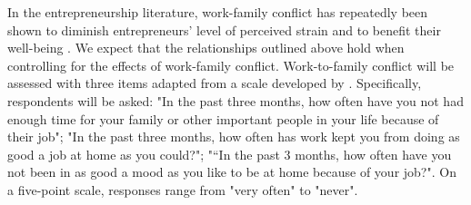 \documentclass[man, 12pt, a4paper, noextraspace]{apa6}
\begin{document}
In the entrepreneurship literature, work-family conflict has repeatedly been shown to diminish entrepreneurs' level of perceived strain and to benefit their well-being \parencite[see][]{Stephan2018}. 
We expect that the relationships outlined above hold when controlling for the effects of work-family conflict. 
Work-to-family conflict will be assessed with three items adapted from a scale developed by \textcite{Hill2005}.
Specifically, respondents will be asked: "In the past three months, how often have you not had enough time for your family or other important people in your life because of their job"; "In the past three months, how often has work kept you from doing as good a job at home as you could?"; "“In the past 3 months, how often have you not been in as good a mood as you like to be at home because of your job?". 
On a five-point scale, responses range from "very often" to "never". 

\printbibliography
\end{document}
